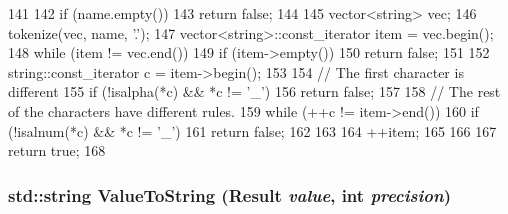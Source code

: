 \begin{DoxyCode}
141 {
142     if (name.empty())
143         return false;
144 
145     vector<string> vec;
146     tokenize(vec, name, '.');
147     vector<string>::const_iterator item = vec.begin();
148     while (item != vec.end()) {
149         if (item->empty())
150             return false;
151 
152         string::const_iterator c = item->begin();
153 
154         // The first character is different
155         if (!isalpha(*c) && *c != '_')
156             return false;
157 
158         // The rest of the characters have different rules.
159         while (++c != item->end()) {
160             if (!isalnum(*c) && *c != '_')
161                 return false;
162         }
163 
164         ++item;
165     }
166 
167     return true;
168 }
\end{DoxyCode}
\hypertarget{namespaceStats_a82baf1560e7ae742b09dae28c115726d}{
\subsubsection[{ValueToString}]{\setlength{\rightskip}{0pt plus 5cm}std::string ValueToString (Result {\em value}, \/  int {\em precision})}}
\label{namespaceStats_a82baf1560e7ae742b09dae28c115726d}


